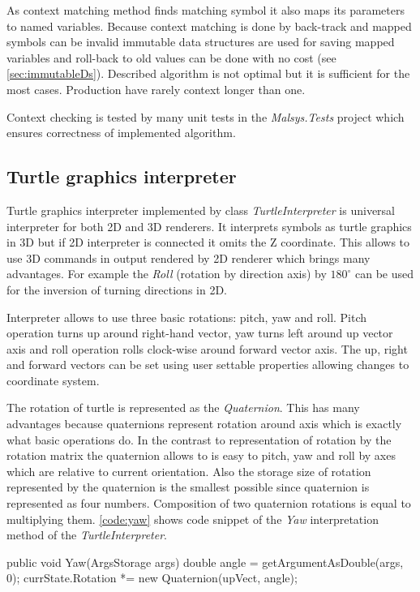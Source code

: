 As context matching method finds matching symbol it also maps its parameters to named variables.
Because context matching is done by back-track and mapped symbols can be invalid immutable data structures are used for saving mapped variables and roll-back to old values can be done with no cost (see \autoref{sec:immutableDs}).
Described algorithm is not optimal but it is sufficient for the most cases.
Production \lsystem have rarely context longer than one.

Context checking is tested by many unit tests in the \emph{Malsys.Tests} project which ensures correctness of implemented algorithm.


\subsection{Turtle graphics interpreter}

Turtle graphics interpreter implemented by class \emph{TurtleInterpreter} is universal interpreter for both 2D and 3D renderers.
It interprets symbols as turtle graphics in 3D but if 2D interpreter is connected it omits the Z coordinate.
This allows to use 3D commands in output rendered by 2D renderer which brings many advantages.
For example the \emph{Roll} (rotation by direction axis) by $180^{\circ}$ can be used for the inversion of turning directions in 2D.

Interpreter allows to use three basic rotations: pitch, yaw and roll.
Pitch operation turns up around right-hand vector, yaw turns left around up vector axis and roll operation rolls clock-wise around forward vector axis.
The up, right and forward vectors can be set using user settable properties allowing changes to coordinate system.

The rotation of turtle is represented as the \emph{Quaternion}.
This has many advantages because quaternions represent rotation around axis which is exactly what basic operations do.
In the contrast to representation of rotation by the rotation matrix the quaternion allows to is easy to pitch, yaw and roll by axes which are relative to current orientation.
Also the storage size of rotation represented by the quaternion is the smallest possible since quaternion is represented as four numbers.
Composition of two quaternion rotations is equal to multiplying them.
\autoref{code:yaw} shows code snippet of the \emph{Yaw} interpretation method of the \emph{TurtleInterpreter}.


\begin{Csharp}[label=code:yaw,caption={Implementation of the \emph{Yaw} method of the \emph{TurtleInterpreter}}]
[SymbolInterpretation(1)]
public void Yaw(ArgsStorage args) {
	double angle = getArgumentAsDouble(args, 0);
	currState.Rotation *= new Quaternion(upVect, angle);
}
\end{Csharp}



